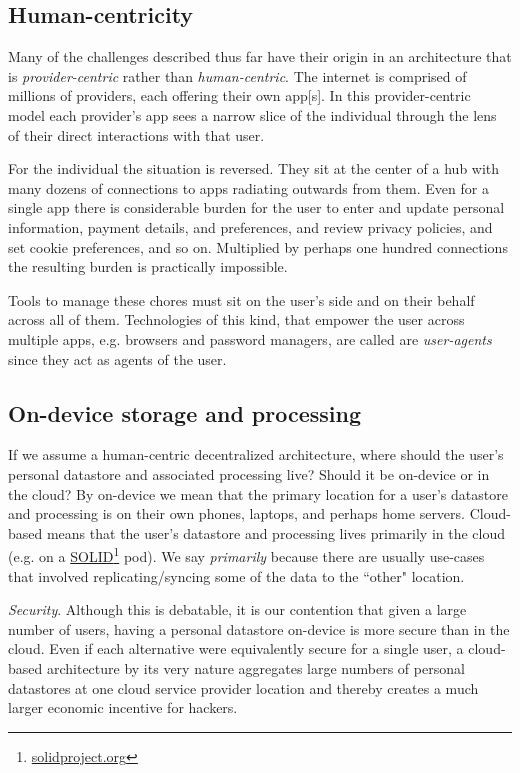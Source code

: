 \documentclass[11pt, oneside]{article}   	%
\newcommand{\hyperfootnote}[1][]{\def\ArgI{{#1}}\hyperfootnoteRelay}
\newcommand\hyperfootnoteRelay[2][]{\href{#1#2}{\ArgI}\footnote{\href{#1#2}{#2}}}
\begin{document}
\subsection{Human-centricity}

Many of the challenges described thus far have their origin in an architecture that is \emph{provider-centric} rather than \emph{human-centric}. The internet is comprised of millions of providers, each offering their own app[s]. In this provider-centric model each provider's app sees a narrow slice of the individual through the lens of their direct interactions with that user. 

For the individual the situation is reversed. They sit at the center of a hub with many dozens of connections to apps radiating outwards from them. Even for a single app there is considerable burden for the user to enter and update personal information, payment details, and preferences, and review privacy policies, and set cookie preferences, and so on. Multiplied by perhaps one hundred connections the resulting burden is practically impossible. 

Tools to manage these chores must sit on the user's side and on their behalf across all of them. Technologies of this kind, that empower the user across multiple apps, e.g. browsers and password managers, are called are \emph{user-agents} since they act as agents of the user. 

\subsection{On-device storage and processing}
If we assume a human-centric decentralized architecture, where should the user's personal datastore and associated processing live? Should it be on-device or in the cloud? By on-device we mean that the primary location for a user's datastore and processing is on their own phones, laptops, and perhaps home servers. Cloud-based means that the user's datastore and processing lives primarily in the cloud (e.g. on a \hyperfootnote[SOLID][https://]{solidproject.org} pod). We say \emph{primarily} because there are usually use-cases that involved replicating/syncing some of the data to the ``other" location. 

\emph{Security}. Although this is debatable, it is our contention that given a large number of users, having a personal datastore on-device is more secure than in the cloud. Even if each alternative were equivalently secure for a single user, a cloud-based architecture by its very nature aggregates large numbers of personal datastores at one cloud service provider location and thereby creates a much larger economic incentive for hackers. 
\end{document}

